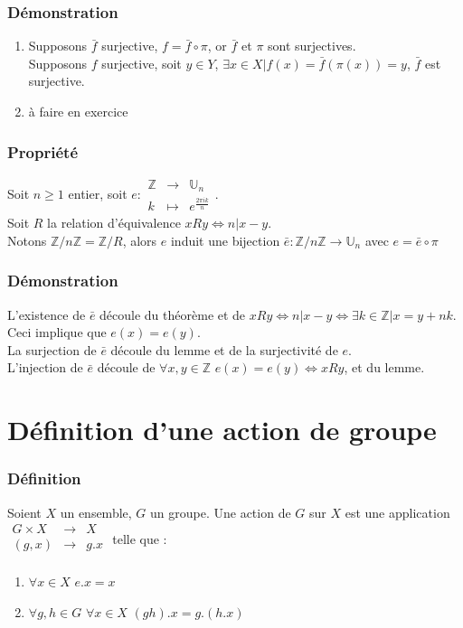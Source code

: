 \documentclass[a4paper, oneside]{report}
\newcommand{\x}{\times}
\newcommand{\Z}{\mathbb{Z}}
\newcommand{\U}{\mathbb{U}}
\begin{document}
\subsubsection{Démonstration}
\begin{enumerate}
\item Supposons $\bar{f}$ surjective, $f=\bar{f}\circ \pi$, or $\bar{f}$ et $\pi$ sont surjectives.\\
Supposons $f$ surjective, soit $y\in Y$, $\exists x \in X | f(x)=\bar{f}(\pi(x))=y$, $\bar{f}$ est surjective.
\item à faire en exercice
\end{enumerate}

\subsubsection{Propriété}
Soit $n\geq 1$ entier, soit $e:\begin{array}{lll}
 \Z &\rightarrow &\U_n\\
k&\mapsto&e^{\frac{2\pi i k}{n}}
\end{array}$.\\
Soit $R$ la relation d'équivalence $xRy\Leftrightarrow n|x-y$.\\
Notons $\Z/n\Z=\Z/R$, alors $e$ induit une bijection $\bar{e}:\Z/n\Z \rightarrow \U_n$ avec $e=\bar{e}\circ \pi$

\subsubsection{Démonstration}
L'existence de $\bar{e}$ découle du théorème et de $xRy \Leftrightarrow n|x-y \Leftrightarrow \exists k\in \Z | x=y+nk$.\\
Ceci implique que $e(x)=e(y)$.\\
La surjection de $\bar{e}$ découle du lemme et de la surjectivité de $e$.\\
L'injection de $\bar{e}$ découle de $\forall x,y\in \Z$ $e(x)=e(y)\Leftrightarrow xRy$, et du lemme.

\section{Définition d'une action de groupe}

\subsubsection{Définition}
Soient $X$ un ensemble, $G$ un groupe. Une action de $G$ sur $X$ est une application $\begin{array}{lll}
G\x X &\rightarrow & X\\
(g,x)&\rightarrow & g.x\\
\end{array}$ telle que :
\begin{enumerate}
\item $\forall x\in X$ $e.x=x$\\
\item $\forall g,h\in G$ $\forall x\in X$ $(gh).x=g.(h.x)$
\end{enumerate}
\end{document}
